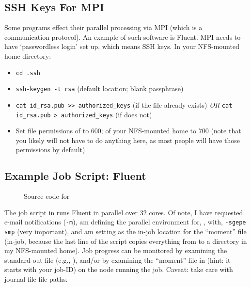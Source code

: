 \documentclass{easychair}
\begin{document}
\subsection{SSH Keys For MPI}

Some programs effect their parallel processing via MPI (which is a communication protocol). An example of such software is Fluent. MPI needs to have `passwordless login' set up, which means SSH keys. In your NFS-mounted home directory:

\begin{itemize}
\item
\texttt{cd .ssh}
\item
\texttt{ssh-keygen -t rsa} (default location; blank passphrase) 
\item
\texttt{cat id\_rsa.pub >> authorized\_keys} (if the  file already exists) \emph{OR} \texttt{cat id\_rsa.pub > authorized\_keys} (if does not) 
\item
Set file permissions of  to 600; of your NFS-mounted home to 700 (note that you likely will not have to do anything here, as most people will have those permissions by default). 
\end{itemize}

\subsection{Example Job Script: Fluent}

\begin{figure}[htpb]
    
    \caption{Source code for }
	\label{fig:fluent.sh}
\end{figure}

The job script in  runs Fluent in parallel over 32 cores. Of note, I have requested e-mail notifications (\texttt{-m}), am defining the parallel environment for, , with, \texttt{-sgepe smp} (very important), and am setting  as the in-job location for the ``moment''  file (in-job, because the last line of the script copies everything from  to a directory in my NFS-mounted home). Job progress can be monitored by examining the standard-out file (e.g., ), and/or by examining the ``moment'' file in  (hint: it starts with your job-ID) on the node running the job. Caveat: take care with journal-file file paths.
\end{document}
